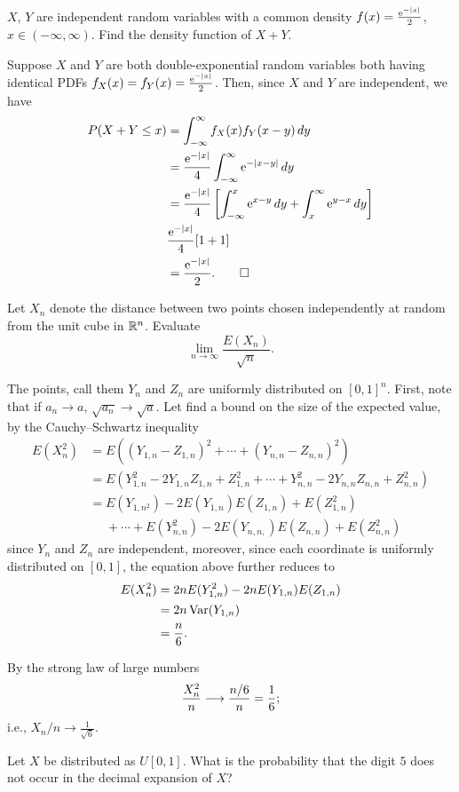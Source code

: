 \begin{problem}
  \(X\), \(Y\) are independent random variables with a common density
  \(f(x)=\frac{\mathrm{e}^{-|x|}}{2}\), \(x\in(-\infty,\infty)\). Find the
  density function of \(X+Y\).
\end{problem}
\begin{solution*}
  Suppose \(X\) and \(Y\) are both double-exponential random variables both
  having identical PDFs \(f_X(x)=f_Y(x)=\frac{\mathrm{e}^{-|x|}}{2}\). Then,
  since \(X\) and \(Y\) are independent, we have
  \begin{align*}
    P(X+Y\leq x)
    &=\int_{-\infty}^\infty f_X(x)f_Y(x-y)\mathop{}\!d y\\
    &=\frac{\mathrm{e}^{-|x|}}{4}\int_{-\infty}^\infty\mathrm{e}^{-|x-y|}\mathop{}\!d y\\
    &=\frac{\mathrm{e}^{-|x|}}{4}
      \left[
      \int_{-\infty}^x\mathrm{e}^{x-y}\mathop{}\!d y
      +\int_x^\infty\mathrm{e}^{y-x}\mathop{}\!d y
      \right]\\
    &\frac{\mathrm{e}^{-|x|}}{4}[1+1]\\
    &=\frac{\mathrm{e}^{-|x|}}{2}.\qedhere
  \end{align*}
\end{solution*}

\begin{problem}
  Let \(X_n\) denote the distance between two points chosen independently
  at random from the unit cube in \(\mathbb{R}^n\). Evaluate
  \[
    \lim_{n\to\infty}\frac{E(X_n)}{\sqrt{n}}.
  \]
\end{problem}
\begin{solution*}
  The points, call them \(Y_n\) and \(Z_n\) are uniformly distributed on
  \([0,1]^n\). First, note that if \(a_n\to a\), \(\sqrt{a_n}\to\sqrt{a}\).
  Let find a bound on the size of the expected value, by the
  Cauchy--Schwartz inequality
  \begin{align*}
    E(X_n^2)
    &=E\left((Y_{1,n}-Z_{1,n})^2+\dotsb+(Y_{n,n}-Z_{n,n})^2\right)\\
    &=E\left(Y_{1,n}^2-2Y_{1,n}Z_{1,n}+Z_{1,n}^2
      +\dotsb+
      Y_{n,n}^2-2Y_{n,n}Z_{n,n}+Z_{n,n}^2
      \right)\\
    &=E(Y_{1,n^2})-2E(Y_{1,n})E(Z_{1,n})+E(Z_{1,n}^2)\\
    &\phantom{{}={}}+\dotsb+E(Y_{n,n}^2)-2E(Y_{n,n,})E(Z_{n,n})+E(Z_{n,n}^2)
  \end{align*}
  since \(Y_n\) and \(Z_n\) are independent, moreover, since each
  coordinate is uniformly distributed on \([0,1]\), the equation above
  further reduces to
  \begin{align*}
    E(X_n^2)
    &=2nE(Y_{1,n}^2)-2nE(Y_{1,n})E(Z_{1,n})\\
    &=2n\operatorname{Var}(Y_{1,n})\\
    &=\frac{n}{6}.
  \end{align*}

  By the strong law of large numbers
  \[
    \frac{X_n^2}{n}\longrightarrow\frac{n/6}{n}=\frac{1}{6};
  \]
  i.e., \(X_n/n\to\frac{1}{\sqrt{6}}\).
\end{solution*}

\begin{problem}
  Let \(X\) be distributed as \(U[0,1]\). What is the probability that the
  digit \(5\) does not occur in the decimal expansion of \(X\)?
\end{problem}
\begin{solution*}

\end{solution*}

